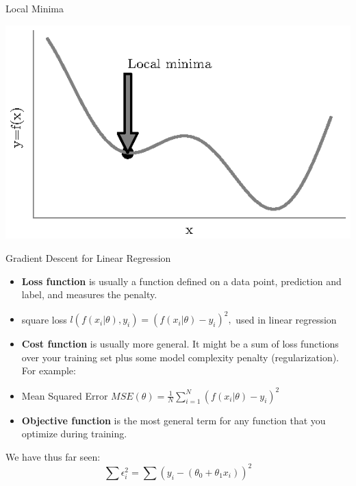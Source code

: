 \documentclass{beamer}
\begin{document}
	\begin{frame}{Local Minima}
\begin{center}
	\includegraphics[totalheight=6cm]{local-minima.eps}
\end{center}
\end{frame}


\begin{frame}{Gradient Descent for Linear Regression}

\begin{itemize}[<+->]
	\item \textbf{Loss function} is usually a function defined on a data point, prediction and label, and measures the penalty. 
	\item square loss \(l\left(f\left(x_{i} | \theta\right), y_{i}\right)=\left(f\left(x_{i} | \theta\right)-y_{i}\right)^{2},\) used in linear regression
	\item \textbf{Cost function} is usually more general. It might be a sum of loss functions over your training set plus some model complexity penalty (regularization). For example:
	\item Mean Squared Error \(M S E(\theta)=\frac{1}{N} \sum_{i=1}^{N}\left(f\left(x_{i} | \theta\right)-y_{i}\right)^{2}\)
	\item \textbf{Objective function} is the most general term for any function that you optimize during training.
\end{itemize}

\pause We have thus far seen:
\pause \begin{equation*}
\sum \epsilon_{i}^{2} = \sum (y_{i} - (\theta_{0} + \theta_{1}x_{i}))^{2}
\end{equation*}
\end{frame}
\end{document}
